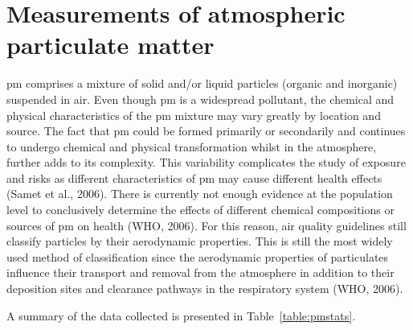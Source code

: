 \documentclass{nwureport}
\begin{document}
\section{Measurements of atmospheric particulate matter}

\gls{pm} comprises a mixture of solid and/or liquid particles (organic and inorganic) suspended in air. Even though \gls{pm} is a widespread pollutant, the chemical and physical characteristics of the \gls{pm} mixture may vary greatly by location and source. The fact that \gls{pm} could be formed primarily or secondarily and continues to undergo chemical and physical transformation whilst in the atmosphere, further adds to its complexity. This variability complicates the study of exposure and risks as different characteristics of \gls{pm} may cause different health effects (Samet et al., 2006). There is currently not enough evidence at the population level to conclusively determine the effects of different chemical compositions or sources of \gls{pm} on health (WHO, 2006). For this reason, air quality guidelines still classify particles by their aerodynamic properties. This is still the most widely used method of classification since the aerodynamic properties of particulates influence their transport and removal from the atmosphere in addition to their deposition sites and clearance pathways in the respiratory system (WHO, 2006).

A summary of the data collected is presented in Table~\ref{table:pmstats}.
\end{document}
